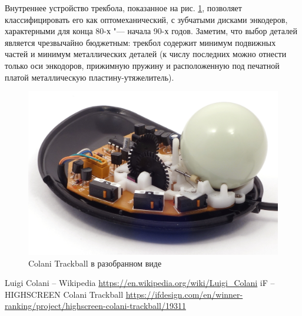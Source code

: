 \documentclass[11pt, a4paper]{article}
\begin{document}
Внутреннее устройство трекбола, показанное на рис. \ref{fig:ColaniInside}, позволяет классифицировать его как оптомеханический, с зубчатыми дисками энкодеров, характерными для конца 80-х "--- начала 90-х годов. Заметим, что выбор деталей является чрезвычайно бюджетным: трекбол содержит минимум подвижных частей и минимум металлических деталей (к числу последних можно отнести только оси энкодоров, прижимную пружину и расположенную под печатной платой металлическую пластину-утяжелитель).

\begin{figure}[h]
    \centering
    \includegraphics[scale=0.8]{1993_colani_trackball/inside_30.jpg}
    \caption{Colani Trackball в разобранном виде}
    \label{fig:ColaniInside}
\end{figure}

\begin{thebibliography}{9}
     Luigi Colani – Wikipedia \url{https://en.wikipedia.org/wiki/Luigi_Colani}
     iF – HIGHSCREEN Colani Trackball \url{https://ifdesign.com/en/winner-ranking/project/highscreen-colani-trackball/19311}
\end{thebibliography}
\end{document}
